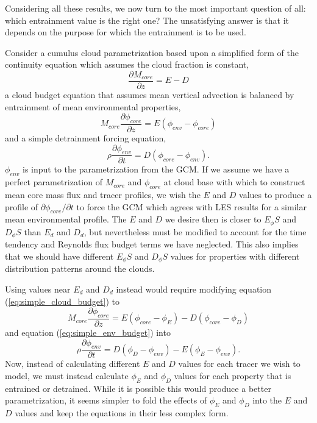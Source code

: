 \documentclass[12pt]{article}
\begin{document}
Considering all these results, we now turn to the most important question of 
all: which entrainment value is the right one?  The unsatisfying answer is that
it depends on the purpose for which the entrainment is to be used.

Consider a cumulus cloud parametrization based upon a simplified form of the continuity equation which assumes the cloud fraction is constant,
\begin{equation}
    \label{eq:simple_continuity}
    \frac{\partial M_{core}}{\partial z} = E - D
\end{equation}
a cloud budget equation that assumes mean vertical advection is balanced by 
entrainment of mean environmental properties,
\begin{equation}
    \label{eq:simple_cloud_budget}
    M_{core} \frac{\partial \phi_{core}}{\partial z} = E(\phi_{env} - \phi_{core})
\end{equation}
and a simple detrainment forcing equation,
\begin{equation}
    \label{eq:simple_env_budget}
    \rho \frac{\partial \phi_{env}}{\partial t} = D(\phi_{core} - \phi_{env}).
\end{equation}
$\phi_{env}$ is input to the parametrization from the GCM.  If we assume we have a perfect parametrization of $M_{core}$ and $\phi_{core}$ at cloud base with
which to construct mean core mass flux and tracer profiles, we wish the $E$ 
and $D$ values to produce a profile of $\partial \phi_{core} / \partial t$ 
to force the GCM which agrees with LES results for a similar mean environmental
profile.  The $E$ and $D$ we desire then is closer to $E_\phi S$ and $D_\phi S$
than $E_d$ and $D_d$, but nevertheless must be modified to account for the 
time tendency and Reynolds flux budget terms we have neglected.  This also 
implies that we should have different $E_\phi S$ and $D_\phi S$ values for 
properties with different distribution patterns around the clouds.

Using values near $E_d$ and $D_d$ instead would require modifying equation 
(\ref{eq:simple_cloud_budget}) to
\begin{equation}
    \label{eq:less_simple_cloud_budget}
    M_{core} \frac{\partial \phi_{core}}{\partial z} 
       = E(\phi_{core} - \phi_E) - D(\phi_{core} - \phi_D)
\end{equation}
and equation (\ref{eq:simple_env_budget}) into
\begin{equation}
    \label{eq:less_simple_env_budget}
    \rho \frac{\partial \phi_{env}}{\partial t} 
       = D(\phi_D - \phi_{env}) - E(\phi_E - \phi_{env}).
\end{equation}
Now, instead of calculating different $E$ and $D$ values for each tracer we 
wish to model, we must instead calculate $\phi_E$ and $\phi_D$ values for 
each property that is entrained or detrained.  While it is possible this would
produce a better parametrization, it seems simpler to fold the effects of 
$\phi_E$ and $\phi_D$ into the $E$ and $D$ values and keep the equations in 
their less complex form.
\end{document}
